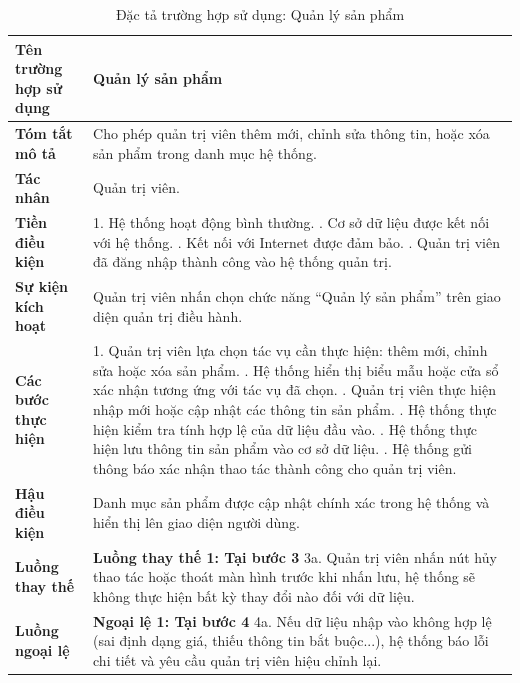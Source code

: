 {
\begin{longtable}{|>{\bfseries}p{4cm}|p{11.5cm}|}
\caption{Đặc tả trường hợp sử dụng: Quản lý sản phẩm}
\label{tab:uc-admin-product-management} \\
\hline
\textbf{Tên trường hợp sử dụng} & Quản lý sản phẩm \\
\hline
\textbf{Tóm tắt mô tả} & Cho phép quản trị viên thêm mới, chỉnh sửa thông tin, hoặc xóa sản phẩm trong danh mục hệ thống. \\
\hline
\textbf{Tác nhân} & Quản trị viên. \\
\hline
\textbf{Tiền điều kiện} & 1. Hệ thống hoạt động bình thường. \newline
2. Cơ sở dữ liệu được kết nối với hệ thống. \newline
3. Kết nối với Internet được đảm bảo. \newline
4. Quản trị viên đã đăng nhập thành công vào hệ thống quản trị. \\
\hline
\textbf{Sự kiện kích hoạt} & Quản trị viên nhấn chọn chức năng “Quản lý sản phẩm” trên giao diện quản trị điều hành. \\
\hline
\textbf{Các bước thực hiện} & 1. Quản trị viên lựa chọn tác vụ cần thực hiện: thêm mới, chỉnh sửa hoặc xóa sản phẩm. \newline
2. Hệ thống hiển thị biểu mẫu hoặc cửa sổ xác nhận tương ứng với tác vụ đã chọn. \newline
3. Quản trị viên thực hiện nhập mới hoặc cập nhật các thông tin sản phẩm. \newline
4. Hệ thống thực hiện kiểm tra tính hợp lệ của dữ liệu đầu vào. \newline
5. Hệ thống thực hiện lưu thông tin sản phẩm vào cơ sở dữ liệu. \newline
6. Hệ thống gửi thông báo xác nhận thao tác thành công cho quản trị viên. \\
\hline
\textbf{Hậu điều kiện} & Danh mục sản phẩm được cập nhật chính xác trong hệ thống và hiển thị lên giao diện người dùng. \\
\hline
\textbf{Luồng thay thế} & \textbf{Luồng thay thế 1: Tại bước 3} \newline
3a. Quản trị viên nhấn nút hủy thao tác hoặc thoát màn hình trước khi nhấn lưu, hệ thống sẽ không thực hiện bất kỳ thay đổi nào đối với dữ liệu. \\
\hline
\textbf{Luồng ngoại lệ} & \textbf{Ngoại lệ 1: Tại bước 4} \newline
4a. Nếu dữ liệu nhập vào không hợp lệ (sai định dạng giá, thiếu thông tin bắt buộc...), hệ thống báo lỗi chi tiết và yêu cầu quản trị viên hiệu chỉnh lại. \\
\hline
\end{longtable}

}
